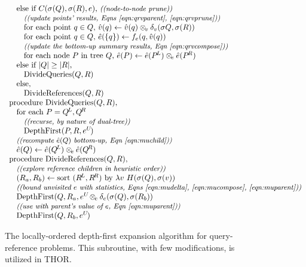 \documentclass[twoside,leqno,twocolumn]{article}
\newcommand{\com}[1]{{\small \textit{((#1))}}}
\newcommand{\summary}{\delta}
\newcommand{\psty}{}
\newcommand{\X}{\\ \psty}
\newcommand{\x}{\X \hspace{0.13in}}
\newcommand{\xx}{\X \hspace{0.26in}}
\newcommand{\kdroot}[1]{#1^{\text{root}}}
\newcommand{\kdleft}[1]{#1^{\!L}}
\newcommand{\kdright}[1]{#1^{\!R}}
\newcommand{\nameop}[2]{#1_{\!#2}}
\newcommand{\myop}[1]{\nameop{\otimes}{#1}}
\newcommand{\letterqr}{v}
\newcommand{\outqr}{V}
\newcommand{\opqr}{\myop{\letterqr}}
\newcommand{\gqr}{g_{\letterqr}}
\newcommand{\letterqrv}{v}
\newcommand{\deltaqrv}{\summary_{\letterqrv}}
\newcommand{\varqr}{\hat{\letterqr}}
\newcommand{\varqrvparent}{\letterqrv^{P}}
\newcommand{\lettermu}{e}
\newcommand{\outopmu}{\myop{\lettermu}}
\newcommand{\opmu}{\myop{\lettermu}}
\newcommand{\fmu}{f_{\lettermu}}
\newcommand{\fmuv}{f_{\lettermu}}
\newcommand{\deltamu}{\summary_{\lettermu}}
\newcommand{\canprunemu}{C}
\newcommand{\heurqr}{H}
\newcommand{\varmuchild}{\hat{\lettermu}}
\newcommand{\varmuparent}{\lettermu^{U\!}}
\newcommand{\outstat}{\sigma}
\begin{document}
\begin{figure}
\[\begin{array}[t]{l}
    \x \text{else if } \canprunemu(\outstat(Q), \outstat(R), \lettermu)\text{, \com{node-to-node prune}}
    \xx \text{\com{update points' results, Eqns \ref{eqn:qrvparent}, \ref{eqn:qrvprune}}}
    \xx \text{for each point }q \in Q\text{, }\varqr(q) \gets \varqr(q) \opqr \deltaqrv(\outstat{Q}, \outstat(R))
    \xx \text{for each point }q \in Q\text{, }\varmuchild(\{q\}) \gets \fmu(q, \varqr(q))
    \xx \text{\com{update the bottom-up summary results, Eqn \ref{eqn:qrvcompose}}}
    \xx \text{for each node }P\text{ in tree }Q\text{, }\varmuchild(P) \gets \varmuchild(\kdleft{P}) \outopmu \varmuchild(\kdright{P})
    \x \text{else if } |Q| \geq |R|\text{,}
    \xx \text{DivideQueries}(Q, R)
    \x \text{else,}
    \xx \text{DivideReferences}(Q, R)
    
    \X \text{procedure DivideQueries}(Q, R)\text{,}
    \x \text{for each } P = \kdleft{Q}, \kdright{Q}
    \xx \text{\com{recurse, by nature of dual-tree}}
    \xx \text{DepthFirst}(P, R, \varmuparent)
    \x \text{\com{recompute $\varmuchild(Q)$ bottom-up, Eqn~\ref{eqn:muchild}}}
    \x \varmuchild(Q) \gets \varmuchild(\kdleft{Q}) \outopmu \varmuchild(\kdright{Q})

    \X \text{procedure DivideReferences}(Q, R)\text{,}
    \x \text{\com{explore reference children in heuristic order}}
    \x (R_a, R_b) \gets \text{sort }(\kdleft{R}, \kdright{R})\text{ by }\lambda v ~ \heurqr(\outstat(Q), \outstat(v))
    \x \text{\com{bound unvisited $\lettermu$ with statistics, Eqns \ref{eqn:mudelta}, \ref{eqn:mucompose}, \ref{eqn:muparent}}}
    \x \text{DepthFirst}(Q, R_a, \varmuparent \opmu \deltamu(\outstat(Q), \outstat(R_b))
    \x \text{\com{use with parent's value of $\lettermu$, Eqn \ref{eqn:muparent}}}
    \x \text{DepthFirst}(Q, R_b, \varmuparent)
  \end{array}
\]
\caption{\label{fig:DepthFirst} The locally-ordered depth-first expansion algorithm for query-reference problems.
This subroutine, with few modifications, is utilized in THOR.
}
\end{figure}
\end{document}
